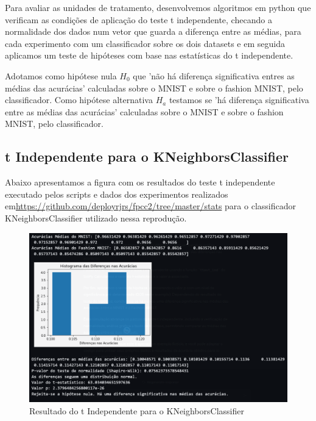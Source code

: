 \documentclass{article}
\begin{document}
Para avaliar as unidades de tratamento, desenvolvemos algoritmos em python que verificam as condições de aplicação do teste t independente, checando a normalidade dos dados num vetor que guarda a diferença entre as médias, para cada experimento com um classificador sobre os dois datasets e em seguida aplicamos um teste de hipóteses com base nas estatísticas do t independente. 

Adotamos como hipótese nula $H_0$ que 'não há diferença significativa entres as médias das acurácias' calculadas sobre o MNIST e sobre o fashion MNIST, pelo classificador. Como hipótese alternativa $H_a$ testamos se 'há diferença significativa entre as médias das acurácias' calculadas sobre o MNIST e sobre o fashion MNIST, pelo classificador.


\subsection{t Independente para o KNeighborsClassifier}
Abaixo apresentamos a figura com os resultados do teste t independente executado pelos scripts e dados dos experimentos realizados em\url{https://github.com/deployrjrs/fpcc2/tree/master/stats} para o classificador KNeighborsClassifier utilizado nessa reprodução.
\begin{figure}[H]
    \centering
    \includegraphics[width=1.0\textwidth]{KNstats.png}
    \caption{Resultado do t Independente para o KNeighborsClassifier}
    \label{fig:knstats}
\end{figure}
\end{document}
